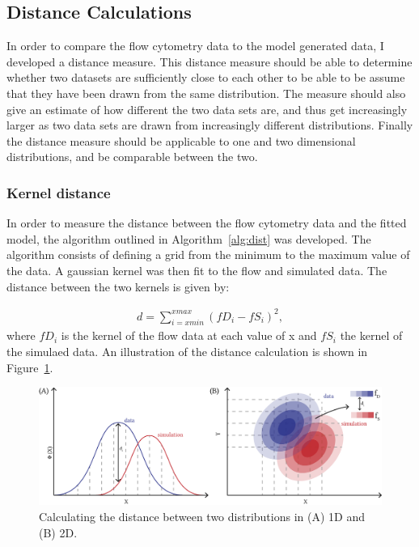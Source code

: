 \subsection{Distance Calculations}

In order to compare the flow cytometry data to the model generated data, I developed a distance measure. This distance measure should be able to determine whether two datasets are sufficiently close to each other to be able to be assume that they have been drawn from the same distribution. The measure should also give an estimate of how different the two data sets are, and thus get increasingly larger as two data sets are drawn from increasingly different distributions. Finally the distance measure should be applicable to one and two dimensional distributions, and be comparable between the two. 


\label{sec:dist}
\subsubsection{Kernel distance}
\label{sec:dist_kernel}
In order to measure the distance between the flow cytometry data and the fitted model, the algorithm outlined in Algorithm~\ref{alg:dist} was developed. The algorithm consists of defining a grid from the minimum to the maximum value of the data. A gaussian kernel was then fit to the flow and simulated data. The distance between the two kernels is given by:

\begin{align*}%
	d = \sum_{i=xmin}^{xmax} (fD_i - fS_i)^2,
\end{align*}
where $fD_i$ is the kernel of the flow data at each value of x and $fS_i$ the kernel of the simulaed data. An illustration of the distance calculation is shown in Figure~\ref{fig:old_dist}.



\begin{figure}[tb]
\centering
\includegraphics[scale=0.8]{../../chapters/chapterABCFlow/images/old_distance.png}
\caption[Kernel distance]{\label{fig:old_dist}Calculating the distance between two distributions in (A) 1D and (B) 2D. }
\end{figure}



